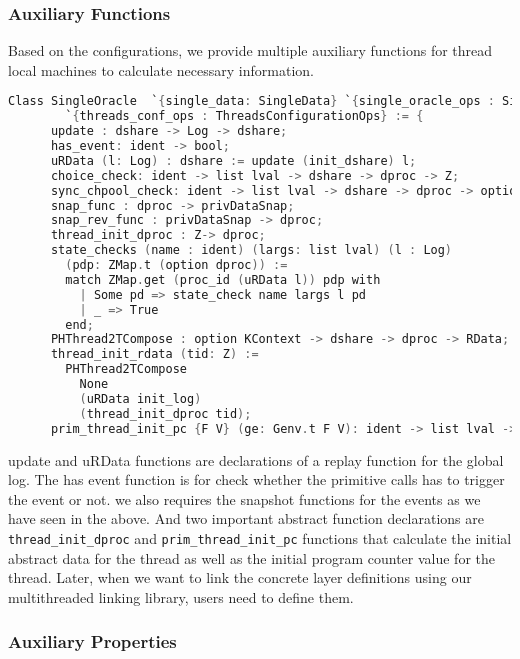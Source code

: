 \subsubsection{Auxiliary Functions}

Based on the configurations, we provide multiple auxiliary functions 
for thread local machines to calculate necessary information. 
\begin{lstlisting}[language=C]
  Class SingleOracle  `{single_data: SingleData} `{single_oracle_ops : SingleOracleOps}  
        `{threads_conf_ops : ThreadsConfigurationOps} := {
      update : dshare -> Log -> dshare;
      has_event: ident -> bool;      
      uRData (l: Log) : dshare := update (init_dshare) l;      
      choice_check: ident -> list lval -> dshare -> dproc -> Z;
      sync_chpool_check: ident -> list lval -> dshare -> dproc -> option SyncChanPool;
      snap_func : dproc -> privDataSnap;
      snap_rev_func : privDataSnap -> dproc; 
      thread_init_dproc : Z-> dproc;
      state_checks (name : ident) (largs: list lval) (l : Log) 
        (pdp: ZMap.t (option dproc)) :=
        match ZMap.get (proc_id (uRData l)) pdp with 
          | Some pd => state_check name largs l pd
          | _ => True
        end;
      PHThread2TCompose : option KContext -> dshare -> dproc -> RData;      
      thread_init_rdata (tid: Z) :=
        PHThread2TCompose
          None
          (uRData init_log)
          (thread_init_dproc tid);
      prim_thread_init_pc {F V} (ge: Genv.t F V): ident -> list lval -> option val }.
\end{lstlisting}
update and uRData functions are  declarations of a replay function for the global log. 
The has event function is for check whether the primitive calls has to trigger the event or not. 
we also requires the snapshot functions for the events as we have seen in the above.
And two important abstract function declarations 
are \lstinline$thread_init_dproc$ and \lstinline$prim_thread_init_pc$ functions 
that calculate the initial abstract data for the thread as well as the initial program counter value 
for the thread. 
Later, when we want to link the concrete layer definitions using our multithreaded linking library, users need to define them.

\subsubsection{Auxiliary Properties}

